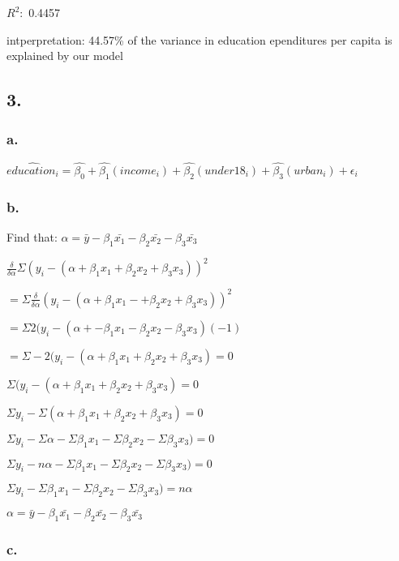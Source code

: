 \documentclass[
]{article}
\begin{document}
\(R^2:\) 0.4457

intperpretation: 44.57\% of the variance in education ependitures per
capita is explained by our model

\hypertarget{section-2}{%
\subsection{3.}\label{section-2}}

\hypertarget{a.}{%
\subsubsection{a.}\label{a.}}

\(\hat{education_i} = \hat{\beta_0} + \hat{\beta_1}(income_i) + \hat{\beta_2}(under18_i) + \hat{\beta_3}(urban_i) + \epsilon_i\)

\hypertarget{b.}{%
\subsubsection{b.}\label{b.}}

Find that:
\(\alpha = \bar{y} - \beta_1\bar{x_1} - \beta_2\bar{x_2} -\beta_3\bar{x_3}\)

\(\frac{\delta}{\delta\alpha} \Sigma( y_i - (\alpha + \beta_1x_1 + \beta_2x_2 + \beta_3x_3))^2\)

\(= \Sigma \frac{\delta}{\delta\alpha} ( y_i - (\alpha + \beta_1x_1 -+\beta_2x_2 +\beta_3x_3))^2\)

\(= \Sigma 2( y_i - (\alpha + - \beta_1x_1 - \beta_2x_2 -\beta_3x_3)(-1)\)

\(= \Sigma -2( y_i - (\alpha + \beta_1x_1 + \beta_2x_2 +\beta_3x_3) = 0\)

\(\Sigma ( y_i - (\alpha + \beta_1x_1 + \beta_2x_2 +\beta_3x_3) = 0\)

\(\Sigma y_i - \Sigma(\alpha + \beta_1x_1 + \beta_2x_2 +\beta_3x_3) = 0\)

\(\Sigma y_i - \Sigma\alpha - \Sigma\beta_1x_1 - \Sigma\beta_2x_2 - \Sigma\beta_3x_3) = 0\)

\(\Sigma y_i - n\alpha - \Sigma\beta_1x_1 - \Sigma\beta_2x_2 - \Sigma\beta_3x_3) = 0\)

\(\Sigma y_i - \Sigma\beta_1x_1 - \Sigma\beta_2x_2 - \Sigma\beta_3x_3) = n\alpha\)

\(\alpha = \bar{y} - \beta_1\bar{x_1} - \beta_2\bar{x_2} -\beta_3\bar{x_3}\)

\hypertarget{c.}{%
\subsubsection{c.}\label{c.}}
\end{document}
